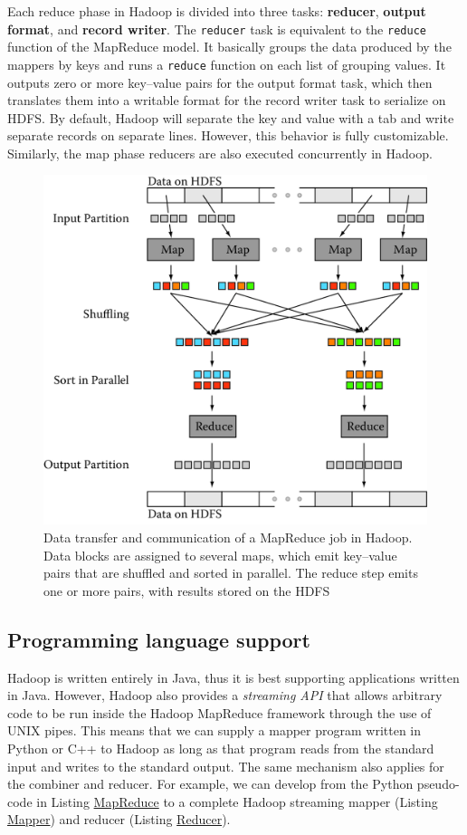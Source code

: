 \documentclass[]{krantz}
\begin{document}
Each reduce phase in Hadoop is divided into three tasks:
\textbf{reducer}, \textbf{output format}, and \textbf{record writer}.
The \texttt{reducer} task is equivalent to the \texttt{reduce} function
of the MapReduce model. It basically groups the data produced by the
mappers by keys and runs a \texttt{reduce} function on each list of
grouping values. It outputs zero or more key--value pairs for the output
format task, which then translates them into a writable format for the
record writer task to serialize on HDFS. By default, Hadoop will
separate the key and value with a tab and write separate records on
separate lines. However, this behavior is fully customizable. Similarly,
the map phase reducers are also executed concurrently in Hadoop.

\begin{figure}

{\centering \includegraphics[width=0.7\linewidth]{ChapterParallel/figures/hadoop} 

}

\caption{Data transfer and communication of a MapReduce job in Hadoop. Data blocks are assigned to several maps, which emit key--value pairs that are shuffled and sorted in parallel. The reduce step emits one or more pairs, with results stored on the HDFS}\label{fig:hadoop}
\end{figure}

\subsection{Programming language
support}\label{programming-language-support}

Hadoop is written entirely in Java, thus it is best supporting
applications written in Java. However, Hadoop also provides a
\emph{streaming API} that allows arbitrary code to be run inside the
Hadoop MapReduce framework through the use of UNIX pipes. This means
that we can supply a mapper program written in Python or C++ to Hadoop
as long as that program reads from the standard input and writes to the
standard output. The same mechanism also applies for the combiner and
reducer. For example, we can develop from the Python pseudo-code in
Listing \protect\hyperlink{list:parallel1}{MapReduce} to a complete
Hadoop streaming mapper (Listing
\protect\hyperlink{list:parallel2}{Mapper}) and reducer (Listing
\protect\hyperlink{list:parallel3}{Reducer}).
\end{document}
